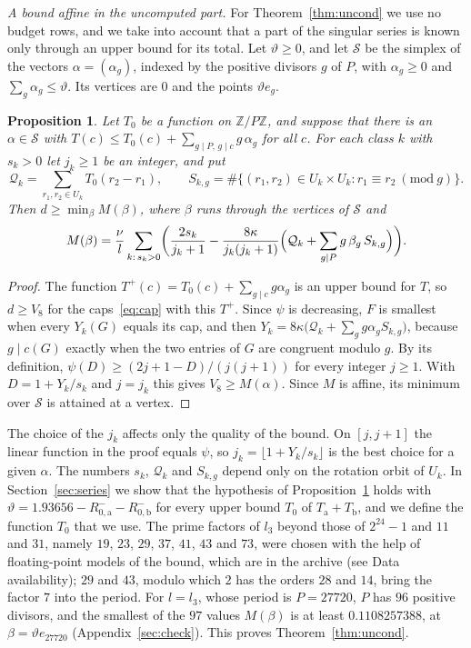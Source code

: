 \documentclass[11pt]{amsart}
\newtheorem{proposition}[theorem]{Proposition}
\theoremstyle{definition}
\theoremstyle{remark}
\numberwithin{equation}{section}
\newcommand{\DuncondGcert}{0.1108257388}
\newcommand{\PerG}{27720}
\begin{document}
\emph{A bound affine in the uncomputed part.} For Theorem~\ref{thm:uncond} we use no budget rows, and we take into account that a part of the singular series is known only through an upper bound for its total. Let $\vartheta\ge0$, and let $\mathcal S$ be the simplex of the vectors $\alpha=(\alpha_g)$, indexed by the positive divisors $g$ of $P$, with $\alpha_g\ge0$ and $\sum_g\alpha_g\le\vartheta$. Its vertices are $0$ and the points $\vartheta e_g$.

\begin{proposition}\label{prop:affine}
Let $T_0$ be a function on $\mathbb Z/P\mathbb Z$, and suppose that there is an $\alpha\in\mathcal S$ with $T(c)\le T_0(c)+\sum_{g\mid P,\,g\mid c}g\,\alpha_g$ for all $c$. For each class $k$ with $s_k>0$ let $j_k\ge1$ be an integer, and put
\[
\mathcal Q_k=\sum_{r_1,r_2\in U_k}T_0(r_2-r_1),\qquad S_{k,g}=\#\{(r_1,r_2)\in U_k\times U_k:r_1\equiv r_2\ (\mathrm{mod}\ g)\}.
\]
Then $d\ge\min_\beta M(\beta)$, where $\beta$ runs through the vertices of $\mathcal S$ and
\[
M(\beta)=\frac\nu l\sum_{k:\,s_k>0}\biggl(\frac{2s_k}{j_k+1}-\frac{8\kappa}{j_k(j_k+1)}\Bigl(\mathcal Q_k+\sum_{g\mid P}g\,\beta_g\,S_{k,g}\Bigr)\biggr).
\]
\end{proposition}

\begin{proof}
The function $T^+(c)=T_0(c)+\sum_{g\mid c}g\alpha_g$ is an upper bound for $T$, so $d\ge V_8$ for the caps~\eqref{eq:cap} with this $T^+$. Since $\psi$ is decreasing, $F$ is smallest when every $Y_k(G)$ equals its cap, and then $Y_k=8\kappa\bigl(\mathcal Q_k+\sum_gg\alpha_gS_{k,g}\bigr)$, because $g\mid c(G)$ exactly when the two entries of $G$ are congruent modulo $g$. By its definition, $\psi(D)\ge(2j+1-D)/(j(j+1))$ for every integer $j\ge1$. With $D=1+Y_k/s_k$ and $j=j_k$ this gives $V_8\ge M(\alpha)$. Since $M$ is affine, its minimum over $\mathcal S$ is attained at a vertex.
\end{proof}

The choice of the $j_k$ affects only the quality of the bound. On $[j,j+1]$ the linear function in the proof equals $\psi$, so $j_k=\lfloor1+Y_k/s_k\rfloor$ is the best choice for a given $\alpha$. The numbers $s_k$, $\mathcal Q_k$ and $S_{k,g}$ depend only on the rotation orbit of $U_k$. In Section~\ref{sec:series} we show that the hypothesis of Proposition~\ref{prop:affine} holds with $\vartheta=1.93656-R_{0,\mathrm a}^--R_{0,\mathrm b}^-$ for every upper bound $T_0$ of $T_{\mathrm a}+T_{\mathrm b}$, and we define the function $T_0$ that we use. The prime factors of $l_3$ beyond those of $2^{24}-1$ and $11$ and $31$, namely $19$, $23$, $29$, $37$, $41$, $43$ and $73$, were chosen with the help of floating-point models of the bound, which are in the archive (see Data availability); $29$ and $43$, modulo which $2$ has the orders $28$ and $14$, bring the factor $7$ into the period. For $l=l_3$, whose period is $P=\PerG$, $P$ has $96$ positive divisors, and the smallest of the $97$ values $M(\beta)$ is at least $\DuncondGcert$, at $\beta=\vartheta e_{27720}$ (Appendix~\ref{sec:check}). This proves Theorem~\ref{thm:uncond}.
\end{document}
